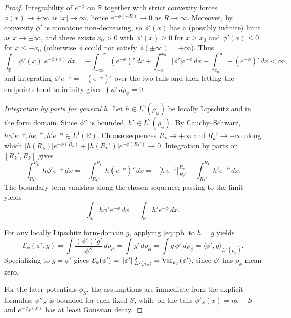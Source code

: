 \begin{proof}
Integrability of $e^{-\phi}$ on $\mathbb R$ together with strict convexity
forces $\phi(x)\to+\infty$ as $|x|\to\infty$, hence $e^{-\phi(\pm R)}\to 0$
as $R\to\infty$. Moreover, by convexity $\phi'$ is monotone non-decreasing,
so $\phi'(x)$ has a (possibly infinite) limit as $x\to\pm\infty$, and there
exists $x_0>0$ with $\phi'(x)\ge 0$ for $x\ge x_0$ and $\phi'(x)\le 0$ for
$x\le -x_0$ (otherwise $\phi$ could not satisfy $\phi(\pm\infty)=+\infty$).
Thus
\[
  \int_{\mathbb R}|\phi'(x)|e^{-\phi(x)}\,dx
  = -\int_{-\infty}^{-x_0}(e^{-\phi})'\,dx
    +\int_{-x_0}^{x_0}|\phi'|e^{-\phi}\,dx
    +\int_{x_0}^{\infty}-(e^{-\phi})'\,dx <\infty,
\]
and integrating $\phi'e^{-\phi}=-(e^{-\phi})'$ over the two tails and then
letting the endpoints tend to infinity gives
$\int\phi'\,d\rho_\phi=0$.

\emph{Integration by parts for general $h$.} Let
$h\in L^2(\rho_\phi)$ be locally Lipschitz and in the form domain. Since
$\phi''$ is bounded, $h'\in L^2(\rho_\phi)$. By Cauchy--Schwarz,
$h\phi' e^{-\phi}, h e^{-\phi}, h' e^{-\phi}\in L^1(\mathbb R)$.
Choose sequences $R_k\to+\infty$ and $R_k'\to-\infty$ along which
$|h(R_k)|e^{-\phi(R_k)}+|h(R_k')|e^{-\phi(R_k')}\to0$. Integration by parts on
$[R_k',R_k]$ gives
\[
  \int_{R_k'}^{R_k}h\phi' e^{-\phi}\,dx
  = -\int_{R_k'}^{R_k}h(e^{-\phi})'\,dx
  = -\bigl[h\,e^{-\phi}\bigr]_{R_k'}^{R_k}
    +\int_{R_k'}^{R_k}h' e^{-\phi}\,dx.
\]
The boundary term vanishes along the chosen sequence; passing to the limit
yields
\begin{equation}\label{eq:ipb}
  \int_{\mathbb R} h\phi' e^{-\phi}\,dx
  = \int_{\mathbb R} h' e^{-\phi}\,dx.
\end{equation}

For any locally Lipschitz form-domain $g$, applying \eqref{eq:ipb} to $h=g$
yields
\[
  \mathcal E_\phi(\phi',g)
  =\int\frac{(\phi')'g'}{\phi''}\,d\rho_\phi
  =\int g'\,d\rho_\phi
  =\int g\,\phi'\,d\rho_\phi
  =\langle\phi',g\rangle_{L^2(\rho_\phi)}.
\]
Specializing to $g=\phi'$ gives
$\mathcal E_\phi(\phi')=\|\phi'\|_{L^2(\rho_\phi)}^2
=\operatorname{Var}_{\rho_\phi}(\phi')$, since $\phi'$ has $\rho_\phi$-mean zero.

For the later potentials $\phi_S$, the assumptions are immediate from the
explicit formulas: $\phi''_S$ is bounded for each fixed $S$, while on the
tails $\phi'_S(x)=\eta x\pm S$ and $e^{-\phi_S(x)}$ has at least Gaussian
decay.
\end{proof}
